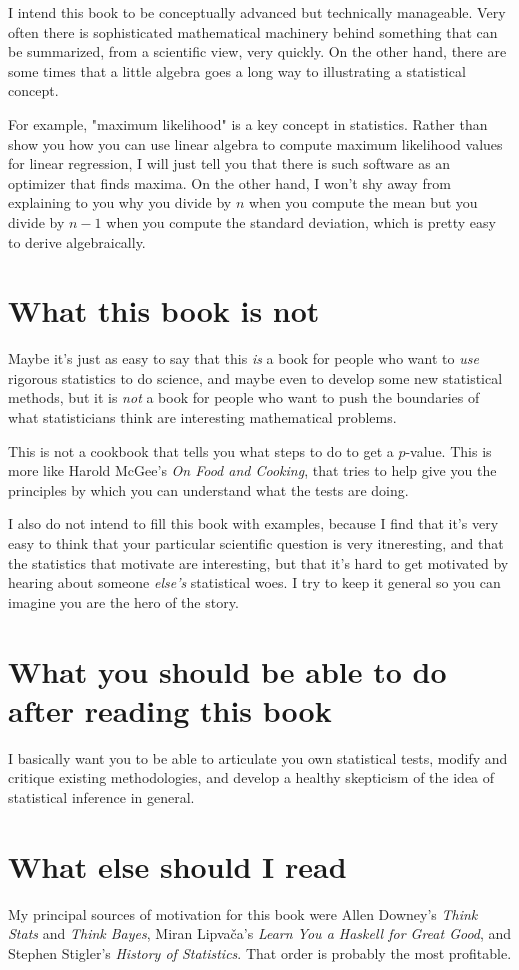 I intend this book to be conceptually advanced but technically manageable. Very
often there is sophisticated mathematical machinery behind something that can
be summarized, from a scientific view, very quickly. On the other hand, there
are some times that a little algebra goes a long way to illustrating a
statistical concept.

For example, "maximum likelihood" is a key concept in statistics. Rather than
show you how you can use linear algebra to compute maximum likelihood values
for linear regression, I will just tell you that there is such software as an
optimizer that finds maxima. On the other hand, I won't shy away from
explaining to you why you divide by $n$ when you compute the mean but you
divide by $n-1$ when you compute the standard deviation, which is pretty easy
to derive algebraically.

\section*{What this book is not}

Maybe it's just as easy to say that this \emph{is} a book for people who want
to \emph{use} rigorous statistics to do science, and maybe even to develop some
new statistical methods, but it is \emph{not} a book for people who want to
push the boundaries of what statisticians think are interesting mathematical
problems.

This is not a cookbook that tells you what steps to do to get a $p$-value. This
is more like Harold McGee's \textit{On Food and Cooking}, that tries to help
give you the principles by which you can understand what the tests are doing.

I also do not intend to fill this book with examples, because I find that it's
very easy to think that your particular scientific question is very
itneresting, and that the statistics that motivate are interesting, but that
it's hard to get motivated by hearing about someone \emph{else's} statistical
woes. I try to keep it general so you can imagine you are the hero of the story.

\section*{What you should be able to do after reading this book}

I basically want you to be able to articulate you own statistical tests, modify
and critique existing methodologies, and develop a healthy skepticism of the
idea of statistical inference in general.

\section*{What else should I read}

My principal sources of motivation for this book were Allen Downey's
\textit{Think Stats} and \textit{Think Bayes}, Miran Lipva\v{c}a's
\textit{Learn You a Haskell for Great Good}, and Stephen Stigler's
\textit{History of Statistics}. That order is probably the most profitable.
